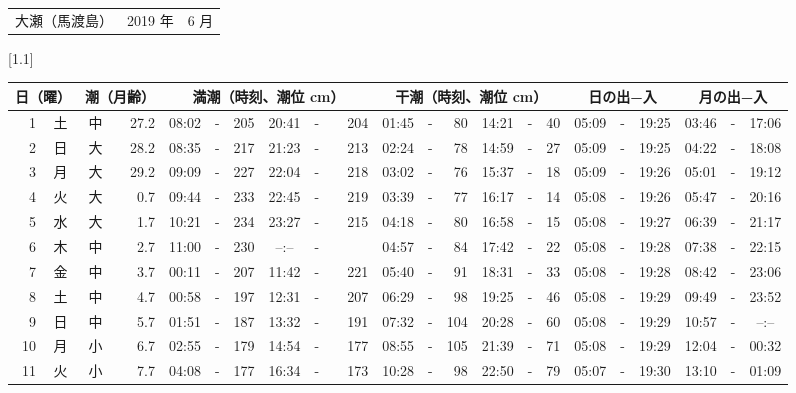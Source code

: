 \documentclass[12pt,a4j]{jsarticle}
\begin{document}
\pagestyle{empty}
 \begin{table}[htbp]
 \begin{center}
 \begin{tabular}{lcc}
 \LARGE{大瀬（馬渡島）}  & \large{2019 年} & \large{ 6 月} \\
 \end{tabular}
 \end{center}
 \begin{center}
    \scalebox{0.7}[1.1]{
    \begin{tabular}{|rc|cr|ccrccr|ccrccr|ccc|ccc|}
    \hline
    \multicolumn{2}{|c|}{日（曜）} & \multicolumn{2}{c|}{潮（月齢）} & \multicolumn{6}{c|}{満潮（時刻、潮位 cm）} & \multicolumn{6}{c|}{干潮（時刻、潮位 cm）} & \multicolumn{3}{c|}{日の出−入} &  \multicolumn{3}{c|}{月の出−入}\\
 \hline
 1 & 土 & 中 & 27.2 &  08:02 &-& 205 &  20:41 &-& 204 &  01:45 &-&  80 &  14:21 &-&  40 & 05:09 & -& 19:25 & 03:46 & -& 17:06 \\
 2 & 日 & 大 & 28.2 &  08:35 &-& 217 &  21:23 &-& 213 &  02:24 &-&  78 &  14:59 &-&  27 & 05:09 & -& 19:25 & 04:22 & -& 18:08 \\
 3 & 月 & 大 & 29.2 &  09:09 &-& 227 &  22:04 &-& 218 &  03:02 &-&  76 &  15:37 &-&  18 & 05:09 & -& 19:26 & 05:01 & -& 19:12 \\
 4 & 火 & 大 &  0.7 &  09:44 &-& 233 &  22:45 &-& 219 &  03:39 &-&  77 &  16:17 &-&  14 & 05:08 & -& 19:26 & 05:47 & -& 20:16 \\
 5 & 水 & 大 &  1.7 &  10:21 &-& 234 &  23:27 &-& 215 &  04:18 &-&  80 &  16:58 &-&  15 & 05:08 & -& 19:27 & 06:39 & -& 21:17 \\
 6 & 木 & 中 &  2.7 &  11:00 &-& 230 &  --:-- &-&~~~~~ &  04:57 &-&  84 &  17:42 &-&  22 & 05:08 & -& 19:28 & 07:38 & -& 22:15 \\
 7 & 金 & 中 &  3.7 &  00:11 &-& 207 &  11:42 &-& 221 &  05:40 &-&  91 &  18:31 &-&  33 & 05:08 & -& 19:28 & 08:42 & -& 23:06 \\
 8 & 土 & 中 &  4.7 &  00:58 &-& 197 &  12:31 &-& 207 &  06:29 &-&  98 &  19:25 &-&  46 & 05:08 & -& 19:29 & 09:49 & -& 23:52 \\
 9 & 日 & 中 &  5.7 &  01:51 &-& 187 &  13:32 &-& 191 &  07:32 &-& 104 &  20:28 &-&  60 & 05:08 & -& 19:29 & 10:57 & -& --:-- \\
10 & 月 & 小 &  6.7 &  02:55 &-& 179 &  14:54 &-& 177 &  08:55 &-& 105 &  21:39 &-&  71 & 05:08 & -& 19:29 & 12:04 & -& 00:32 \\
11 & 火 & 小 &  7.7 &  04:08 &-& 177 &  16:34 &-& 173 &  10:28 &-&  98 &  22:50 &-&  79 & 05:07 & -& 19:30 & 13:10 & -& 01:09 \\

\end{tabular}}
\end{center}
\end{table}
\end{document}
